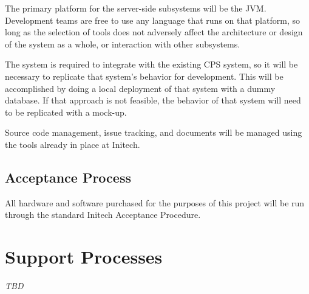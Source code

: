 \documentclass[11pt]{article}
\begin{document}
The primary platform for the server-side subsystems will be the JVM.  Development teams are free to
use any language that runs on that platform, so long as the selection of tools does not adversely
affect the architecture or design of the system as a whole, or interaction with other subsystems.

The system is required to integrate with the existing CPS system, so it will be necessary to
replicate that system's behavior for development.  This will be accomplished by doing a local
deployment of that system with a dummy database.  If that approach is not feasible, the behavior of
that system will need to be replicated with a mock-up.

Source code management, issue tracking, and documents will be managed using the tools already in
place at Initech.


\subsection{Acceptance Process}

All hardware and software purchased for the purposes of this project will be run through the
standard Initech Acceptance Procedure.



\section{Support Processes}
\textit{TBD}
\end{document}
